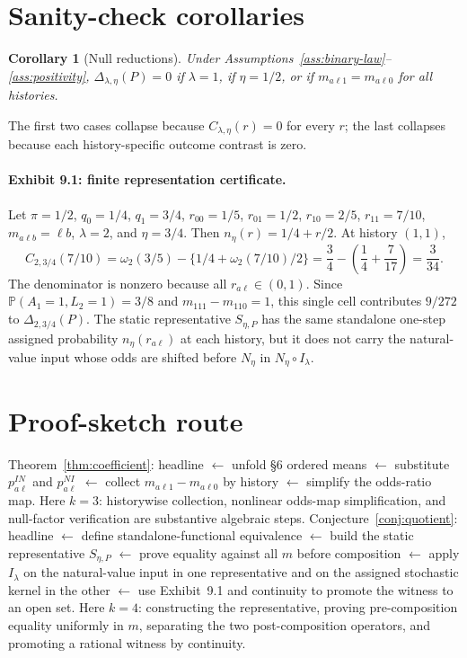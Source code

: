 \documentclass[11pt]{article}
\renewcommand{\Pr}{\mathbb{P}}
\theoremstyle{definition}
\theoremstyle{plain}
\newtheorem{corollary}{Corollary}
\theoremstyle{remark}
\begin{document}
\section{Sanity-check corollaries}
\begin{corollary}[Null reductions]\label{cor:null}
Under Assumptions~\ref{ass:binary-law}--\ref{ass:positivity}, \(\Delta_{\lambda,\eta}(P)=0\) if \(\lambda=1\), if \(\eta=1/2\), or if \(m_{a\ell1}=m_{a\ell0}\) for all histories.
\end{corollary}
The first two cases collapse because \(C_{\lambda,\eta}(r)=0\) for every \(r\); the last collapses because each history-specific outcome contrast is zero.

\paragraph{Exhibit 9.1: finite representation certificate.}
Let \(\pi=1/2\), \(q_0=1/4\), \(q_1=3/4\), \(r_{00}=1/5\), \(r_{01}=1/2\), \(r_{10}=2/5\), \(r_{11}=7/10\), \(m_{a\ell b}=\ell b\), \(\lambda=2\), and \(\eta=3/4\). Then \(n_\eta(r)=1/4+r/2\). At history \((1,1)\),
\[
C_{2,3/4}(7/10)=\omega_2(3/5)-\{1/4+\omega_2(7/10)/2\}
=\frac{3}{4}-\left(\frac14+\frac{7}{17}\right)=\frac{3}{34}.
\]
The denominator is nonzero because all \(r_{a\ell}\in(0,1)\). Since \(\Pr(A_1=1,L_2=1)=3/8\) and \(m_{111}-m_{110}=1\), this single cell contributes \(9/272\) to \(\Delta_{2,3/4}(P)\). The static representative \(S_{\eta,P}\) has the same standalone one-step assigned probability \(n_\eta(r_{a\ell})\) at each history, but it does not carry the natural-value input whose odds are shifted before \(N_\eta\) in \(N_\eta\circ I_\lambda\).

\section{Proof-sketch route}
Theorem~\ref{thm:coefficient}: headline \(\leftarrow\) unfold \S6 ordered means \(\leftarrow\) substitute \(p^{IN}_{a\ell}\) and \(p^{NI}_{a\ell}\) \(\leftarrow\) collect \(m_{a\ell1}-m_{a\ell0}\) by history \(\leftarrow\) simplify the odds-ratio map. Here \(k=3\): historywise collection, nonlinear odds-map simplification, and null-factor verification are substantive algebraic steps. Conjecture~\ref{conj:quotient}: headline \(\leftarrow\) define standalone-functional equivalence \(\leftarrow\) build the static representative \(S_{\eta,P}\) \(\leftarrow\) prove equality against all \(m\) before composition \(\leftarrow\) apply \(I_\lambda\) on the natural-value input in one representative and on the assigned stochastic kernel in the other \(\leftarrow\) use Exhibit~9.1 and continuity to promote the witness to an open set. Here \(k=4\): constructing the representative, proving pre-composition equality uniformly in \(m\), separating the two post-composition operators, and promoting a rational witness by continuity.
\end{document}
